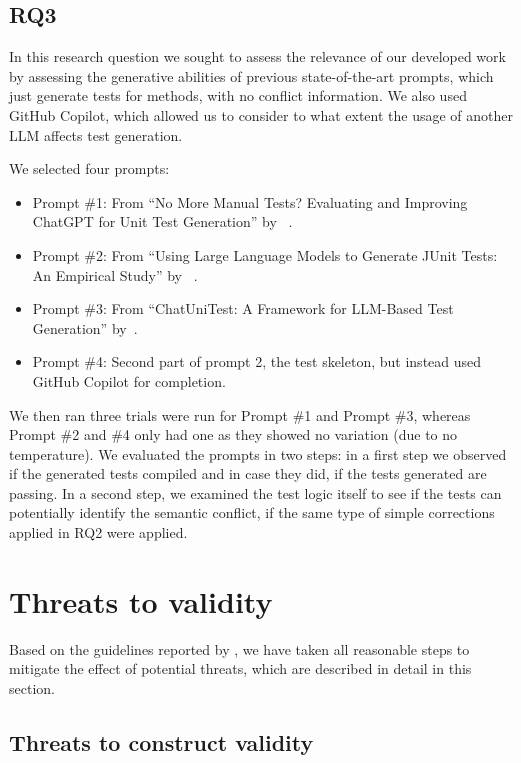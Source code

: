 \subsection{RQ3}

In this research question we sought to assess the relevance of our developed work by assessing the generative abilities of previous state-of-the-art prompts, which just generate tests for methods, with no conflict information.
We also used GitHub Copilot, which allowed us to consider to what extent the usage of another LLM affects test generation.

We selected four prompts:
\begin{itemize}
  \item Prompt \#1: From ``No More Manual Tests? Evaluating and Improving ChatGPT for Unit Test Generation'' by ~\citet{kn:chattester}.
  \item Prompt \#2: From ``Using Large Language Models to Generate JUnit Tests: An Empirical Study'' by ~\citet{kn:siddiq2023empirical}.
  \item Prompt \#3: From ``ChatUniTest: A Framework for LLM-Based Test Generation'' by~\citet{kn:chatunitest}.
  \item Prompt \#4: Second part of prompt 2, the test skeleton, but instead used GitHub Copilot for completion.
\end{itemize}
%
We then ran three trials were run for Prompt \#1 and Prompt \#3, whereas Prompt \#2 and \#4 only had one as they showed no variation (due to no temperature).
We evaluated the prompts in two steps: in a first step we observed if the generated tests compiled and in case they did, if the tests generated are passing.
In a second step, we examined the test logic itself to see if the tests can potentially identify the semantic conflict, if the same type of simple corrections applied in RQ2 were applied.

\section{Threats to validity}

Based on the guidelines reported by \citet{wohlin2012experimentation}, we have
taken all reasonable steps to mitigate the effect of potential threats, which
are described in detail in this section.

\subsection{Threats to construct validity}

